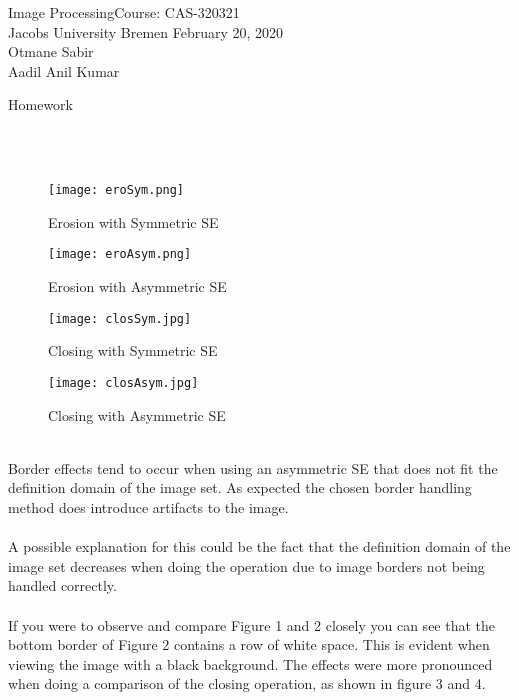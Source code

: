 \documentclass[a4paper]{article}
\newcommand{\coursename}{Image Processing}
\newcommand{\courseno}{CAS-320321}
\newcommand{\sheettitle}{Homework}
\newcommand{\mytoday}{{February 20}, 2020}
\newcounter{assignmentno}
\newcommand{\assignment}{\arabic{assignmentno}}
\begin{document}
\coursename \hfill Course: \courseno\\
Jacobs University Bremen \hfill \mytoday\\
{Otmane Sabir}\hfill \\
{Aadil Anil Kumar}\hfill
\vspace*{0.3cm}\\
\begin{center}
{\Large \sheettitle{} {\assignment}\\}
\end{center}
\\

\large{} \\

\begin{figure}[ht] 
  \label{ fig7} 
  \begin{minipage}[b]{0.5\linewidth}
    \centering
    \texttt{[image: eroSym.png]} 
    \caption{Erosion with Symmetric SE} 
    \vspace{4ex}
  \end{minipage}%
  \begin{minipage}[b]{0.5\linewidth}
    \centering
    \texttt{[image: eroAsym.png]} 
    \caption{Erosion with Asymmetric SE} 
    \vspace{4ex}
  \end{minipage} 
  \begin{minipage}[b]{0.5\linewidth}
    \centering
    \texttt{[image: closSym.jpg]} 
    \caption{Closing with Symmetric SE} 
    \vspace{4ex}
  \end{minipage}%
  \begin{minipage}[b]{0.5\linewidth}
    \centering
    \texttt{[image: closAsym.jpg]} 
    \caption{Closing with Asymmetric SE} 
    \vspace{4ex}
  \end{minipage} 
\end{figure} \\
Border effects tend to occur when using an asymmetric SE that does not fit the definition domain of the image set.
As expected the chosen border handling method does introduce artifacts to the image.\\ \\
A possible explanation for this could be the fact that the definition domain of the image set decreases when doing the operation due to image borders not being handled correctly.\\ \\
If you were to observe and compare Figure 1 and 2 closely you can see that the bottom border of Figure 2 contains a row of white space. This is evident when viewing the image with a black background. The effects were more pronounced when doing a comparison of the closing operation, as shown in figure 3 and 4.
\end{document}
